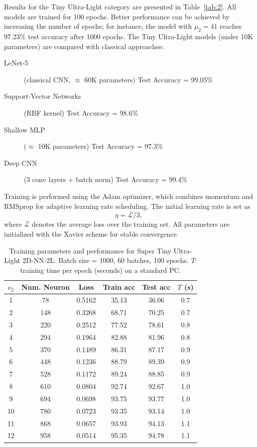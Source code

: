 \documentclass[pdflatex,sn-mathphys-num]{sn-jnl}%
\theoremstyle{thmstyleone}%
\theoremstyle{thmstyletwo}%
\theoremstyle{thmstylethree}%
\begin{document}
Results for the Tiny Ultra-Light category are presented in Table~\ref{tab:2}.
All models are trained for 100 epochs.
Better performance can be achieved by increasing the number of epochs;
for instance, the model with $\mu_2=41$ reaches 97.23\% test accuracy after 1000 epochs.
The Tiny Ultra-Light models (under 10K parameters) are compared with classical approaches:
\begin{description}
\item[LeNet-5 \cite{LeCun1998}] (classical CNN, $\approx$ 60K parameters) Test Accuracy = 99.05\%
\item[Support-Vector Networks \cite{Cortes1995}] (RBF kernel) Test Accuracy = 98.6\%
\item[Shallow MLP \cite{Rumelhart1986}] ($\approx$ 10K parameters) Test Accuracy = 97.3\%
\item[Deep CNN \cite{Krizhevsky2012}] (3 conv layers + batch norm) Test Accuracy = 99.4\%
\end{description}

Training is performed using the Adam optimizer, which combines momentum and RMSprop for adaptive learning rate scheduling.
The initial learning rate is set as
\[\eta=\bar{\mathcal{L}}/3,\]
where $\bar{\mathcal{L}}$ denotes the average loss over the training set.
All parameters are initialized with the Xavier scheme for stable convergence.

\begin{table}[htbp]
\centering
\caption{Training parameters and performance for Super Tiny Ultra-Light 2D-NN-2L.
Batch size = 1000, 60 batches, 100 epochs.
$T$: training time per epoch (seconds) on a standard PC.}
\label{tab:1}
\begin{tabular}{|c|c|c|c|c|c|}
\hline
$\nu_2$ & Num. Neuron & Loss   & Train acc & Test acc & $T$ (s) \\
\hline
1    & 78    & 0.5162  & 35.13  & 36.06  & 0.7 \\
2    & 148   & 0.3268  & 68.71  & 70.25  & 0.7 \\
3    & 220   & 0.2512  & 77.52  & 78.61  & 0.8 \\
4    & 294   & 0.1964  & 82.88  & 81.96  & 0.8 \\
5    & 370   & 0.1489  & 86.31  & 87.17  & 0.9 \\
6    & 448   & 0.1236  & 88.79  & 89.39  & 0.9 \\
7    & 528   & 0.1172  & 89.24  & 88.85  & 0.9 \\
8    & 610   & 0.0804  & 92.74  & 92.67  & 1.0 \\
9    & 694   & 0.0698  & 93.75  & 93.77  & 1.0 \\
10   & 780   & 0.0723  & 93.35  & 93.14  & 1.0 \\
11   & 868   & 0.0657  & 93.93  & 94.13  & 1.1 \\
12   & 958   & 0.0514  & 95.35  & 94.78  & 1.1 \\
\hline
\end{tabular}%
\end{table}
\end{document}
